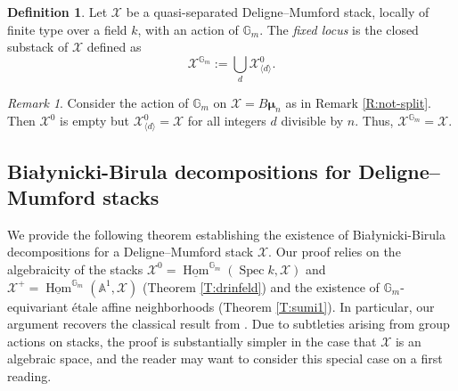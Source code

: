 \documentclass[a4paper]{amsart}
\theoremstyle{plain}
\theoremstyle{definition}
\newtheorem{definition}[theorem]{Definition}
\theoremstyle{remark}
\newtheorem{remark}[theorem]{Remark}
\numberwithin{equation}{section}
\newcommand{\GG}{\mathbb{G}}
\renewcommand\AA{\mathbb{A}}
\newcommand\cX{\mathcal{X}}
\DeclareMathOperator{\Spec}{Spec}
\newcommand{\Gmu}{\pmb{\mu}}
\DeclareMathOperator{\Hom}{Hom}
\begin{document}
\begin{definition} \label{D:fixed-locus}
Let $\cX$ be a quasi-separated Deligne--Mumford stack, 
locally of finite type over a field $k$, with an action of $\GG_m$.  The {\it fixed locus} is the closed substack of $\cX$ defined as
$$\cX^{\GG_m} := \bigcup_d \cX_{\langle d \rangle}^0.$$
\end{definition}

\begin{remark}
Consider the action of $\GG_m$ on $\cX=B \Gmu_n$ as in Remark \ref{R:not-split}.  Then $\cX^0$ is empty but $\cX_{\langle d \rangle}^0 = \cX$ for all integers $d$ divisible by $n$.  Thus, $\cX^{\GG_m} = \cX$.
\end{remark}

\subsection{Bia\l ynicki-Birula decompositions for Deligne--Mumford stacks} \label{A:BB}

We provide the following theorem establishing the existence of Bia\l ynicki-Birula decompositions for a Deligne--Mumford stack $\cX$.  Our proof relies on the algebraicity of the stacks $\cX^0 = \underline{\Hom}^{\GG_m}(\Spec k, \cX)$ and $\cX^+ = \underline{\Hom}^{\GG_m}(\AA^1,\cX)$ (Theorem \ref{T:drinfeld}) and the existence of $\GG_m$-equivariant \'etale affine neighborhoods (Theorem \ref{T:sumi1}).  In particular, our argument recovers the classical result from \cite[Thm.~4.1]{bb}.   Due to subtleties arising from group actions on stacks, the proof is substantially simpler in the case that $\cX$ is an algebraic space, and the reader may want to consider this special case on a first reading.
\end{document}
